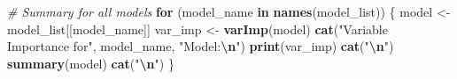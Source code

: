 \documentclass[
]{article}
\newenvironment{Shaded}{\begin{snugshade}}{\end{snugshade}}
\newcommand{\CommentTok}[1]{\textcolor[rgb]{0.56,0.35,0.01}{\textit{#1}}}
\newcommand{\ControlFlowTok}[1]{\textcolor[rgb]{0.13,0.29,0.53}{\textbf{#1}}}
\newcommand{\FunctionTok}[1]{\textcolor[rgb]{0.13,0.29,0.53}{\textbf{#1}}}
\newcommand{\NormalTok}[1]{#1}
\newcommand{\OtherTok}[1]{\textcolor[rgb]{0.56,0.35,0.01}{#1}}
\newcommand{\SpecialCharTok}[1]{\textcolor[rgb]{0.81,0.36,0.00}{\textbf{#1}}}
\newcommand{\StringTok}[1]{\textcolor[rgb]{0.31,0.60,0.02}{#1}}
\begin{document}
\begin{Shaded}
\begin{Highlighting}[]
\CommentTok{\# Summary for all models}
\ControlFlowTok{for}\NormalTok{ (model\_name }\ControlFlowTok{in} \FunctionTok{names}\NormalTok{(model\_list)) \{}
\NormalTok{  model }\OtherTok{\textless{}{-}}\NormalTok{ model\_list[[model\_name]]}
\NormalTok{  var\_imp }\OtherTok{\textless{}{-}} \FunctionTok{varImp}\NormalTok{(model)}
  \FunctionTok{cat}\NormalTok{(}\StringTok{"Variable Importance for"}\NormalTok{, model\_name, }\StringTok{"Model:}\SpecialCharTok{\textbackslash{}n}\StringTok{"}\NormalTok{)}
  \FunctionTok{print}\NormalTok{(var\_imp)}
  \FunctionTok{cat}\NormalTok{(}\StringTok{"}\SpecialCharTok{\textbackslash{}n}\StringTok{"}\NormalTok{)}
  \FunctionTok{summary}\NormalTok{(model)}
  \FunctionTok{cat}\NormalTok{(}\StringTok{"}\SpecialCharTok{\textbackslash{}n}\StringTok{"}\NormalTok{)}
\NormalTok{\}}
\end{Highlighting}
\end{Shaded}
\end{document}
